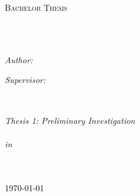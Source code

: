 \documentclass[
12pt, %
english, %
singlespacing, %
headsepline, %
]{MastersDoctoralThesis} %
\author{Sami \textsc{Arja}} %
\begin{document}
\frontmatter %

\pagestyle{plain} %


\begin{titlepage}
\begin{center}

\vspace*{.06\textheight}
{\scshape\LARGE \univname\par}\vspace{1.5cm} %
\textsc{\Large Bachelor Thesis}\\[0.5cm] %

\HRule \\[0.4cm] %
{\huge \bfseries \ttitle\par}\vspace{0.4cm} %
\HRule \\[1.5cm] %
 
\begin{minipage}[t]{0.4\textwidth}
\begin{flushleft} \large
\emph{Author:}\\
\href{https://github.com/samiarja}{\authorname} %
\end{flushleft}
\end{minipage}
\begin{minipage}[t]{0.4\textwidth}
\begin{flushright} \large
\emph{Supervisor:} \\
\href{https://www.westernsydney.edu.au/staff_profiles/uws_profiles/associate_professor_gu_fang}{\supname} %
\end{flushright}
\end{minipage}\\[3cm]
 
\vfill

\large \textit{Thesis 1: Preliminary Investigation\\  \degreename}\\[0.3cm] %
\textit{in}\\[0.4cm]
\groupname\\\deptname\\[2cm] %
 
\vfill

{\large \today}\\[4cm] %
 
\vfill
\end{center}
\end{titlepage}
\end{document}
